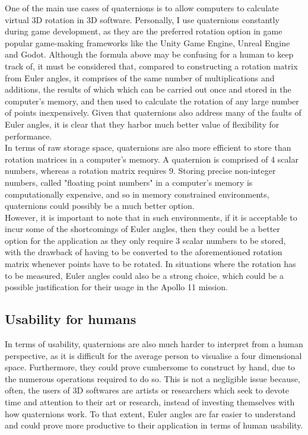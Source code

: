 \documentclass[12pt, a4paper]{article}
\begin{document}
One of the main use cases of quaternions is to allow computers to calculate
virtual 3D rotation in 3D software. Personally, I use quaternions constantly
during game development, as they are the preferred rotation option in game
popular game-making frameworks like the Unity Game Engine, Unreal Engine and
Godot. Although the formula above may be confusing for a human to keep track of,
it must be considered that, compared to constructing a rotation matrix from
Euler angles, it comprises of the same number of multiplications and additions,
the results of which which can be carried out once and stored in the computer's
memory, and then used to calculate the rotation of any large number of points
inexpensively. Given that quaternions also address many of the faults of Euler
angles, it is clear that they harbor much better value of flexibility for
performance. \\

In terms of raw storage space, quaternions are also more efficient to store than
rotation matrices in a computer's memory. A quaternion is comprised of 4 scalar
numbers, whereas a rotation matrix requires 9. Storing precise non-integer
numbers, called "floating point numbers" in a computer's memory is
computationally expensive, and so in memory constrained environments,
quaternions could possibly be a much better option. \\

However, it is important to note that in such environments, if it is acceptable
to incur some of the shortcomings of Euler angles, then they could be a better
option for the application as they only require 3 scalar numbers to be stored,
with the drawback of having to be converted to the aforementioned rotation
matrix whenever points have to be rotated. In situations where the rotation has
to be measured, Euler angles could also be a strong choice, which could be a
possible justification for their usage in the Apollo 11 mission.  \\

\subsection{Usability for humans}
In terms of usability, quaternions are also much harder to interpret from a
human perspective, as it is difficult for the average person to visualise a four
dimensional space. Furthermore, they could prove cumbersome to construct by
hand, due to the numerous operations required to do so. This is not a negligible
issue because, often, the users of 3D softwares are artists or researchers which
seek to devote time and attention to their art or research, instead of investing
themselves with how quaternions work. To that extent, Euler angles are far
easier to understand and could prove more productive to their application in
terms of human usability. \\
\end{document}
